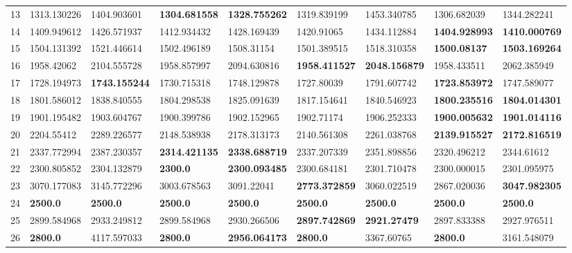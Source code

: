 \begin{table*}[b]
\begin{tabular}{|p{0.8cm}|p{1.6cm}|p{1.6cm}|p{1.6cm}|p{1.6cm}|p{1.6cm}|p{1.6cm}|p{1.6cm}|p{1.6cm}|}
13  & 1313.130226 & 1404.903601 & \textbf{1304.681558} & \textbf{1328.755262} & 1319.839199 & 1453.340785 & 1306.682039 & 1344.282241 \\ 
14  & 1409.949612 & 1426.571937 & 1412.934432 & 1428.169439 & 1420.91065 & 1434.112884 & \textbf{1404.928993} & \textbf{1410.000769} \\ 
15  & 1504.131392 & 1521.446614 & 1502.496189 & 1508.31154 & 1501.389515 & 1518.310358 & \textbf{1500.08137} & \textbf{1503.169264} \\ 
16  & 1958.42062 & 2104.555728 & 1958.857997 & 2094.630816 & \textbf{1958.411527} & \textbf{2048.156879} & 1958.433511 & 2062.385949 \\ 
17  & 1728.194973 & \textbf{1743.155244} & 1730.715318 & 1748.129878 & 1727.80039 & 1791.607742 & \textbf{1723.853972} & 1747.589077 \\ 
18  & 1801.586012 & 1838.840555 & 1804.298538 & 1825.091639 & 1817.154641 & 1840.546923 & \textbf{1800.235516} & \textbf{1804.014301} \\ 
19  & 1901.195482 & 1903.604767 & 1900.399786 & 1902.152965 & 1902.71174 & 1906.252333 & \textbf{1900.005632} & \textbf{1901.014116} \\ 
20  & 2204.55412 & 2289.226577 & 2148.538938 & 2178.313173 & 2140.561308 & 2261.038768 & \textbf{2139.915527} & \textbf{2172.816519} \\ 
21  & 2337.772994 & 2387.230357 & \textbf{2314.421135} & \textbf{2338.688719} & 2337.207339 & 2351.898856 & 2320.496212 & 2344.61612 \\ 
22  & 2300.805852 & 2304.132879 & \textbf{2300.0} & \textbf{2300.093485} & 2300.684181 & 2301.710478 & 2300.000015 & 2301.095975 \\ 
23  & 3070.177083 & 3145.772296 & 3003.678563 & 3091.22041 & \textbf{2773.372859} & 3060.022519 & 2867.020036 & \textbf{3047.982305} \\ 
24  & \textbf{2500.0} & \textbf{2500.0} & \textbf{2500.0} & \textbf{2500.0} & \textbf{2500.0} & \textbf{2500.0} & \textbf{2500.0} & \textbf{2500.0} \\ 
25  & 2899.584968 & 2933.249812 & 2899.584968 & 2930.266506 & \textbf{2897.742869} & \textbf{2921.27479} & 2897.833388 & 2927.976511 \\ 
26  & \textbf{2800.0} & 4117.597033 & \textbf{2800.0} & \textbf{2956.064173} & \textbf{2800.0} & 3367.60765 & \textbf{2800.0} & 3161.548079 \\ 

\end{tabular}
\end{table*}
